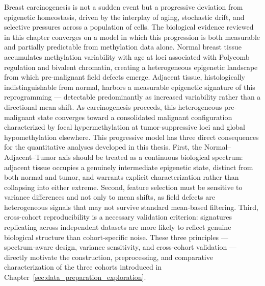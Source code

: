 Breast carcinogenesis is not a sudden event but a progressive deviation from
epigenetic homeostasis, driven by the interplay of aging, stochastic drift, and
selective pressures across a population of cells. The biological evidence reviewed
in this chapter converges on a model in which this progression is both measurable
and partially predictable from methylation data alone.
Normal breast tissue accumulates methylation variability with age at loci
associated with Polycomb regulation and bivalent chromatin, creating a
heterogeneous epigenetic landscape from which pre-malignant field defects emerge.
Adjacent tissue, histologically indistinguishable from normal, harbors a
measurable epigenetic signature of this reprogramming — detectable predominantly
as increased variability rather than a directional mean shift. As carcinogenesis
proceeds, this heterogeneous pre-malignant state converges toward a consolidated
malignant configuration characterized by focal hypermethylation at
tumor-suppressive loci and global hypomethylation elsewhere.
This progressive model has three direct consequences for the quantitative analyses
developed in this thesis. First, the Normal--Adjacent--Tumor axis should be treated
as a continuous biological spectrum: adjacent tissue occupies a genuinely
intermediate epigenetic state, distinct from both normal and tumor, and warrants
explicit characterization rather than collapsing into either extreme. Second,
feature selection must be sensitive to variance differences and not only to mean
shifts, as field defects are heterogeneous signals that may not survive standard
mean-based filtering. Third, cross-cohort reproducibility is a necessary
validation criterion: signatures replicating across independent datasets are more
likely to reflect genuine biological structure than cohort-specific noise.
These three principles — spectrum-aware design, variance sensitivity, and
cross-cohort validation — directly motivate the construction, preprocessing, and
comparative characterization of the three cohorts introduced in
Chapter~\ref{sec:data_preparation_exploration}.